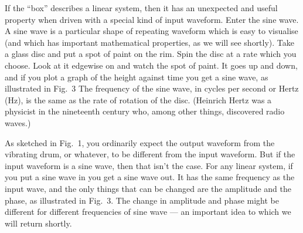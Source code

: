   If the ``box'' describes a linear system, then it has an unexpected and 
  useful property when driven with a special kind of input waveform. Enter the 
  sine wave. A sine wave is a particular shape of repeating waveform which is 
  easy to visualise (and which has important mathematical properties, as we 
  will see shortly). Take a glass disc and put a spot of paint on the rim. Spin 
  the disc at a rate which you choose. Look at it edgewise on and watch the 
  spot of paint. It goes up and down, and if you plot a graph of the height 
  against time you get a sine wave, as illustrated in Fig.\ 3 The frequency of 
  the sine wave, in cycles per second or Hertz (Hz), is the same as the rate of 
  rotation of the disc. (Heinrich Hertz was a physicist in the nineteenth 
  century who, among other things, discovered radio waves.) 

  As sketched in Fig.\ 1, you ordinarily expect the output waveform from the 
  vibrating drum, or whatever, to be different from the input waveform. But if 
  the input waveform is a sine wave, then that isn't the case. For any linear 
  system, if you put a sine wave in you get a sine wave out. It has the same 
  frequency as the input wave, and the only things that can be changed are the 
  amplitude and the phase, as illustrated in Fig.\ 3. The change in amplitude 
  and phase might be different for different frequencies of sine wave --- an 
  important idea to which we will return shortly. 

